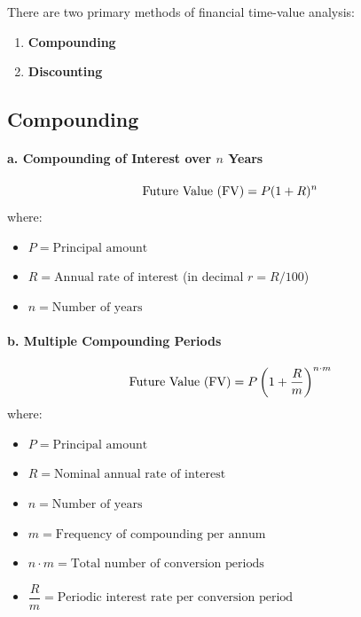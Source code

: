 There are two primary methods of financial time-value analysis:
\begin{enumerate}[noitemsep]
    \item \textbf{Compounding}
    \item \textbf{Discounting}
\end{enumerate}

\subsection{Compounding}

\begin{formulabox}
\paragraph{a. Compounding of Interest over $n$ Years}
\begin{equation}
    \text{Future Value } (\operatorname{FV}) = P(1 + R)^n
\end{equation}
where:
\begin{itemize}[noitemsep]
    \item $P = \text{Principal amount}$
    \item $R = \text{Annual rate of interest}$ (in decimal $r = R/100$)
    \item $n = \text{Number of years}$
\end{itemize}

\vspace{0.6em}
\paragraph{b. Multiple Compounding Periods}
\begin{equation}
    \text{Future Value } (\operatorname{FV}) = P\left(1 + \frac{R}{m}\right)^{n \cdot m}
\end{equation}
where:
\begin{itemize}[noitemsep]
    \item $P = \text{Principal amount}$
    \item $R = \text{Nominal annual rate of interest}$
    \item $n = \text{Number of years}$
    \item $m = \text{Frequency of compounding per annum}$
    \item $n \cdot m = \text{Total number of conversion periods}$
    \item $\dfrac{R}{m} = \text{Periodic interest rate per conversion period}$
\end{itemize}
\end{formulabox}

